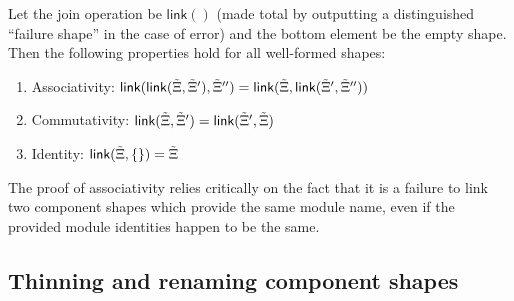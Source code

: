 \begin{lemma} \normalfont{}
Let the join operation be $\textsf{link}()$ (made total by outputting a distinguished ``failure shape'' in the case of error) and the bottom element be the empty shape.  Then the following properties hold for all well-formed shapes:
\begin{enumerate}
    \item Associativity: $\textsf{link}(\textsf{link}({\tilde{\Xi}}, {\tilde{\Xi}}'), {\tilde{\Xi}}'') = \textsf{link}({\tilde{\Xi}}, \textsf{link}({\tilde{\Xi}}', {\tilde{\Xi}}''))$
    \item Commutativity: $\textsf{link}({\tilde{\Xi}}, {\tilde{\Xi}}') = \textsf{link}({\tilde{\Xi}}', {\tilde{\Xi}})$
    \item Identity: $\textsf{link}({\tilde{\Xi}}, \{\}) = {\tilde{\Xi}}$
\end{enumerate}
\end{lemma}

The proof of associativity relies critically on the fact that it is a failure
to link two component shapes which provide the same module name, even if the
provided module identities happen to be the same.

\subsection{Thinning and renaming component shapes}




